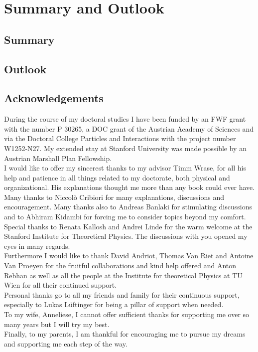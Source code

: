 \documentclass[12pt]{report}
\begin{document}
\chapter{Summary and Outlook}
\section{Summary}

\section{Outlook}

\newpage
\section*{Acknowledgements}
During the course of my doctoral studies I have been funded by an FWF grant with the number P 30265, a DOC grant of the Austrian Academy of Sciences and via the Doctoral College Particles  and Interactions with the project  number W1252-N27. My extended stay at Stanford University was made possible by an Austrian Marshall Plan Fellowship.\\
I would like to offer my sincerest thanks to my advisor Timm Wrase, for all his help and patience in all things related to my doctorate, both physical and organizational. His explanations thought me more than any book could ever have.\\
Many thanks to Niccol\`o Cribiori for many explanations, discussions and encouragement. Many thanks also to Andreas Banlaki for stimulating discussions and to Abhiram Kidambi for forcing me to consider topics beyond my comfort.\\
Special thanks to Renata Kallosh and Andrei Linde for the warm welcome at the Stanford Institute for Theoretical Physics. The discussions with you opened my eyes in many regards.\\
Furthermore I would like to thank David Andriot, Thomas Van Riet and Antoine Van Proeyen for the fruitful collaborations and kind help offered and Anton Rebhan as well as all the people at the Institute  for theoretical Physics at TU Wien for all their continued support.\\
Personal thanks go to all my friends and family for their continuous support, especially to Lukas Lüftinger for being a pillar of support when needed.\\
To my wife, Anneliese, I cannot offer sufficient thanks for supporting me over so many years but I will try my best.\\
Finally, to my parents, I am thankful for encouraging me to pursue my dreams and supporting me each step of the way.
\end{document}
